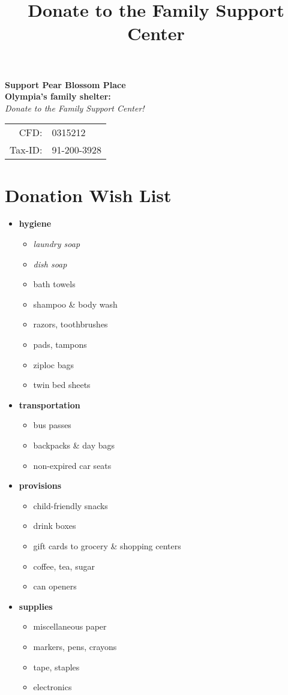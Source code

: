 \documentclass[14pt]{extarticle}
\title{Donate to the Family Support Center}
\begin{document}
\pagestyle{empty}
\noindent
{\huge \bf Support Pear Blossom Place} \\
{\Huge \bf Olympia's family shelter:}\\
{\LARGE \emph{Donate to the Family Support Center!}}\\
\begin{center}
\begin{tabular}{r l}
{\LARGE CFD:} & {\LARGE 0315212} \\
{\LARGE Tax-ID:} & {\LARGE 91-200-3928}
\end{tabular}
\end{center}

\section*{Donation Wish List}

\begin{multicols}{2}
\begin{itemize}
    \item \textbf{hygiene}
    \begin{itemize}
        \item \emph{laundry soap}
        \item \emph{dish soap}
        \item bath towels
        \item shampoo \& body wash 
        \item razors, toothbrushes
        \item pads, tampons
        \item ziploc bags
        \item twin bed sheets
    \end{itemize}
    \item \textbf{transportation}
    \begin{itemize}
        \item bus passes
        \item backpacks \& day bags
        \item non-expired car seats
    \end{itemize}
    \item \textbf{provisions}
    \begin{itemize}
        \item child-friendly snacks
        \item drink boxes
        \item gift cards to grocery \& shopping centers
        \item coffee, tea, sugar
        \item can openers
    \end{itemize}
    \item \textbf{supplies}
    \begin{itemize}
        \item miscellaneous paper
        \item markers, pens, crayons
        \item tape, staples
        \item electronics
    \end{itemize}
\end{itemize}
\end{multicols}
\end{document}
